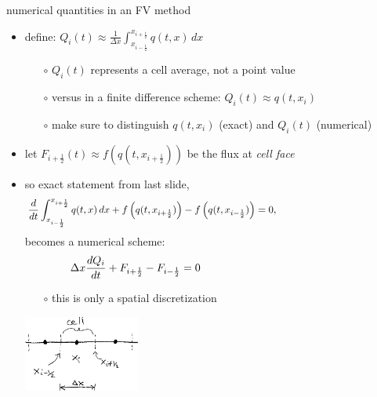 \documentclass[10pt,dvipsnames,usepdftitle=false,
hyperref={pdftitle = {Finite volume methods},
    pdfauthor = {Ed Bueler}}]{beamer}
\newcommand{\xiphalf}{{x_{i+\frac{1}{2}}}}
\newcommand{\ximhalf}{{x_{i-\frac{1}{2}}}}
\newcommand{\Fiphalf}{{F_{i+\frac{1}{2}}}}
\newcommand{\Fimhalf}{{F_{i-\frac{1}{2}}}}
\newcommand{\ds}{\displaystyle}
\begin{document}
\begin{frame}{numerical quantities in an FV method}

\begin{itemize}
\item define: \qquad $\ds Q_i(t) \approx \frac{1}{\Delta x} \int_\ximhalf^\xiphalf q(t,x)\,dx$
    \begin{itemize}
    \item[$\circ$] $Q_i(t)$ represents a cell average, not a point value
    \item[$\circ$] versus in a finite difference scheme: $Q_i(t) \approx q(t,x_i)$
    \item[$\circ$] make sure to distinguish $q(t,x_i)$ (exact) and $Q_i(t)$ (numerical)
    \end{itemize}
\item let $\Fiphalf(t) \approx f\left(q(t,\xiphalf)\right)$ be the flux at \emph{cell face}
\item so exact statement from last slide,
$$\frac{d}{dt} \int_\ximhalf^\xiphalf q(t,x) \,dx + f\left(q(t,\xiphalf)\right) - f\left(q(t,\ximhalf)\right) = 0, \hspace{50mm}$$
becomes a numerical scheme:
$$\Delta x \frac{dQ_i}{dt} + \Fiphalf - \Fimhalf = 0 \hspace{50mm}$$
    \begin{itemize}
    \item[$\circ$] this is only a spatial discretization
    \end{itemize}

\vspace{-25mm}
\hfill \includegraphics[width=0.3\textwidth]{figs/fvsketch}

\end{itemize}
\end{frame}
\end{document}
